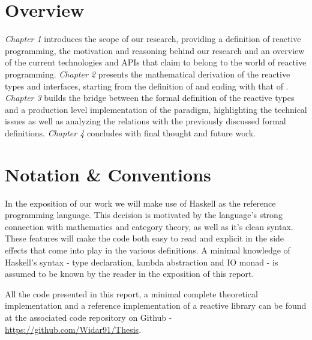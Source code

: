 \section*{Overview}

\textit{Chapter 1} introduces the scope of our research, providing a definition of reactive programming, the motivation and reasoning behind our research and an overview of the current technologies and APIs that claim to belong to the world of reactive programming. \textit{Chapter 2} presents the mathematical derivation of the reactive types and interfaces, starting from the definition of  and ending with that of . \textit{Chapter 3} builds the bridge between the formal definition of the reactive types and a production level implementation of the paradigm, highlighting the technical issues as well as analyzing the relations with the previously discussed formal definitions. \textit{Chapter 4} concludes with final thought and future work.

\section*{Notation \& Conventions}

In the exposition of our work we will make use of Haskell as the reference programming language. This decision is motivated by the language's strong connection with mathematics and category theory, as well as it's clean syntax. These features will make the code both easy to read and explicit in the side effects that come into play in the various definitions. A minimal knowledge of Haskell's syntax - type declaration, lambda abstraction and IO monad - is assumed to be known by the reader in the exposition of this report. 

All the code presented in this report, a minimal complete theoretical implementation and a reference implementation of a reactive library can be found at the associated code repository on Github - \url{https://github.com/Widar91/Thesis}. 
